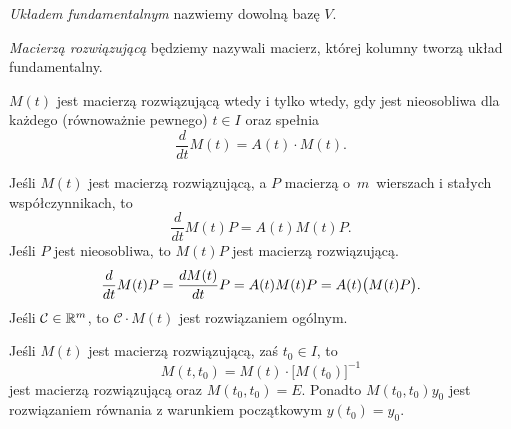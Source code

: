 %
\begin{definition}
  \emph{Układem fundamentalnym} nazwiemy dowolną bazę $V$.
\end{definition}
%
\begin{definition}
  \emph{Macierzą rozwiązującą} będziemy nazywali macierz, której kolumny tworzą układ fundamentalny.
\end{definition}
%
\begin{statement}
  $M(t)$ jest macierzą rozwiązującą wtedy i tylko wtedy, gdy jest nieosobliwa dla każdego (równoważnie pewnego)
  $t \in I$ oraz spełnia
%
  \begin{equation*}
    \frac{d}{dt} M(t) = A(t) \cdot M(t).
  \end{equation*}
\end{statement}
%
\begin{remark}
  Jeśli $M(t)$ jest macierzą rozwiązującą, a $P$ macierzą o~$m$~wierszach i stałych współczynnikach, to
%
  \begin{equation*}
    \frac{d}{dt} M(t) P = A(t) M(t) P.
  \end{equation*}
%
  Jeśli $P$ jest nieosobliwa, to $M(t)P$ jest macierzą rozwiązującą.
%
  \begin{equation*}
    \frac{d}{dt} M(t)P = \frac{d M(t)}{dt} P = A(t) M(t) P = A(t) \p[\big]{M(t) P}.
  \end{equation*}
%
  Jeśli $\mathcal{C} \in \R^m$, to $\mathcal{C} \cdot M(t)$ jest rozwiązaniem ogólnym.
  
  Jeśli $M(t)$ jest macierzą rozwiązującą, zaś $t_0 \in I$, to 
  \begin{equation*}
    M(t, t_0) = M(t) \cdot \big[ M(t_0) \big]^{-1}
  \end{equation*}
%
  jest macierzą rozwiązującą oraz $M(t_0,t_0) = E$. Ponadto $M(t_0,t_0) y_0$ jest rozwiązaniem równania z warunkiem 
  początkowym $y(t_0) = y_0$.
\end{remark}
































